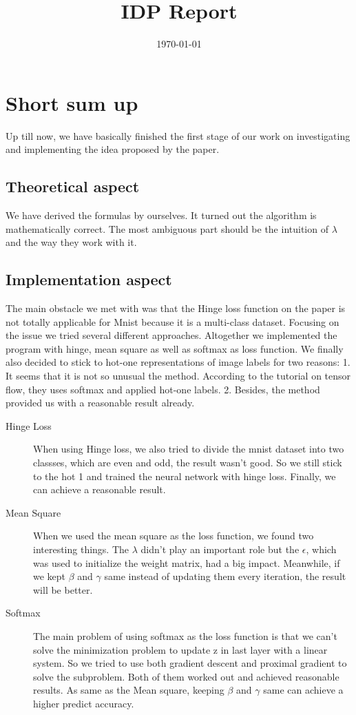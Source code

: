 \documentclass{article}
\title{IDP Report}
\date{\today}
\begin{document}
\maketitle

\section{Short sum up}
Up till now, we have basically finished the first stage of our work on investigating and implementing the idea proposed by the paper.
\subsection{Theoretical aspect}
We have derived the formulas by ourselves. It turned out the algorithm is mathematically correct. The most ambiguous part should be the intuition of $\lambda$ and the way they work with it. 

\subsection{Implementation aspect}
The main obstacle we met with was that the Hinge loss function on the paper is not totally applicable for Mnist  because it is a multi-class dataset. Focusing on the issue we tried several different approaches. Altogether we implemented the program with hinge, mean square as well as softmax as loss function. We finally also decided to stick to hot-one representations of image labels for two reasons:
1. It seems that it is not so unusual the method. According to the tutorial on tensor flow, they uses softmax and applied hot-one labels.
2. Besides, the method provided us with a reasonable result already.

\begin{description}
\item[Hinge Loss]
When using Hinge loss, we also tried to divide the mnist dataset into two classses, which are even and odd, the result wasn't good. So we still stick to the hot 1 and trained the neural network with hinge loss. Finally, we can achieve a reasonable result.

\item[Mean Square]
When we used the mean square as the loss function, we found two interesting things. The $\lambda$ didn't play an important role but the $\epsilon$, which was used to initialize the weight matrix, had a big impact. Meanwhile, if we kept $\beta$ and $\gamma$ same instead of updating them every iteration, the result will be better.

\item[Softmax]
The main problem of using softmax as the loss function is that we can't solve the minimization problem to update z in last layer with a linear system. So we tried to use both gradient descent and proximal gradient to solve the subproblem. Both of them worked out and achieved reasonable results. As same as the Mean square, keeping $\beta$ and $\gamma$ same can achieve a higher predict accuracy. 
\end{description}
\end{document}
